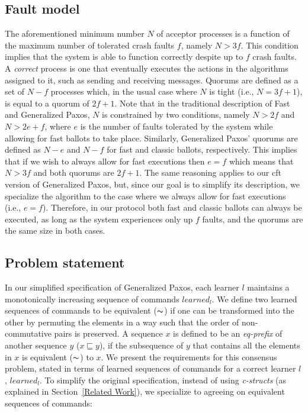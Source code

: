 \subsection{Fault model}
The aforementioned minimum number $N$ of acceptor processes is a function of the maximum number of tolerated crash faults $f$, namely $N > 3f$. This condition implies that the system is able to function correctly despite up to $f$ crash faults. A \textit{correct} process is one that eventually executes the actions in the algorithms assigned to it, such as sending and receiving messages. Quorums are defined as a set of $N-f$ processes which, in the usual case where $N$ is tight (i.e., $N=3f+1$), is equal to a quorum of $2f+1$. Note that in the traditional description of Fast and Generalized Paxos, $N$ is constrained by two conditions, namely $N>2f$ and $N>2e+f$, where $e$ is the number of faults tolerated by the system while allowing for fast ballots to take place. Similarly, Generalized Paxos' quorums are defined as $N-e$ and $N-f$ for fast and classic ballots, respectively. This implies that if we wish to always allow for fast executions then $e=f$ which means that $N>3f$ and both quorums are $2f+1$. The same reasoning applies to our \acrshort{cft} version of Generalized Paxos, but, since our goal is to simplify its description, we specialize the algorithm to the case where we always allow for fast executions (i.e., $e=f$). Therefore, in our protocol both fast and classic ballots can always be executed, as long as the system experiences only up $f$ faults, and the quorums are the same size in both cases.

\subsection{Problem statement} \label{cft_problem}
In our simplified specification of Generalized Paxos, each learner $l$ maintains a monotonically increasing sequence of commands $learned_l$. We define two learned sequences of commands to be equivalent ($\thicksim$) if one can be transformed into the other by permuting the elements in a way such that the order of non-commutative pairs is preserved. A sequence $x$ is defined to be an \textit{eq-prefix} of another sequence $y$ ($x \sqsubseteq y$), if the subsequence of $y$ that contains all the elements in $x$ is equivalent ($\thicksim$) to $x$. We present the requirements for this consensus problem, stated in terms of learned sequences of commands for a correct learner $l$, $learned_l$. To simplify the original specification, instead of using \textit{c-structs} (as explained in Section~\ref{Related Work}), we specialize to agreeing on equivalent sequences of commands:

